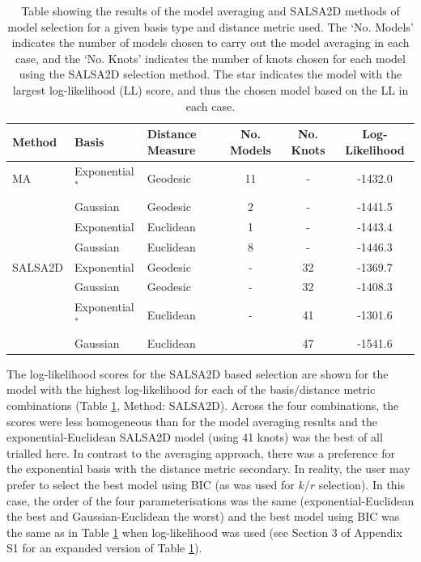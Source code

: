 \documentclass[letterpaper, 12pt]{interact}
\begin{document}
	
	\begin{table}[!ht]
		\centering
		\caption{Table showing the results of the model averaging and SALSA2D methods of model selection for a given basis type and distance metric used. The `No. Models' indicates the number of models chosen to carry out the model averaging in each case, and the `No. Knots' indicates the number of knots chosen for each model using the SALSA2D selection method. The star indicates the model with the largest log-likelihood (LL) score, and thus the chosen model based on the LL in each case.}
		\vspace{0.5cm}
		\begin{tabular}{l |l|l|c|c|c}
			Method & Basis & Distance Measure & No. Models & No. Knots & Log-Likelihood\\
			\hline
			MA & Exponential$^*$ & Geodesic & 11 & - & -1432.0\\
			&  Gaussian & Geodesic & 2 & -& -1441.5\\
			& Exponential & Euclidean & 1 & -& -1443.4\\
			&  Gaussian & Euclidean & 8 & - & -1446.3\\
			\hline
			SALSA2D & Exponential & Geodesic & - & 32 & -1369.7\\
			& Gaussian & Geodesic & - & 32 & -1408.3 \\
			& Exponential$^*$ & Euclidean & - & 41 & -1301.6\\
			& Gaussian & Euclidean & & 47 & -1541.6\\
		\end{tabular}
		\label{tab:mrsearesult}
	\end{table}
	
	
	
	The log-likelihood scores for the SALSA2D based selection are shown for the model with the highest log-likelihood for each of the basis/distance metric combinations (Table \ref{tab:mrsearesult}, Method: SALSA2D). Across the four combinations, the scores were less homogeneous than for the model averaging results and the exponential-Euclidean SALSA2D model (using 41 knots) was the best of all trialled here. In contrast to the averaging approach, there was a preference for the exponential basis with the distance metric secondary. In reality, the user may prefer to select the best model using BIC (as was used for $k$/$r$ selection). In this case, the order of the four parameterisations was the same (exponential-Euclidean the best and Gaussian-Euclidean the worst) and the best model using BIC was the same as in Table \ref{tab:mrsearesult} when log-likelihood was used (see Section 3 of Appendix S1 for an expanded version of Table \ref{tab:mrsearesult}).
	
\end{document}
